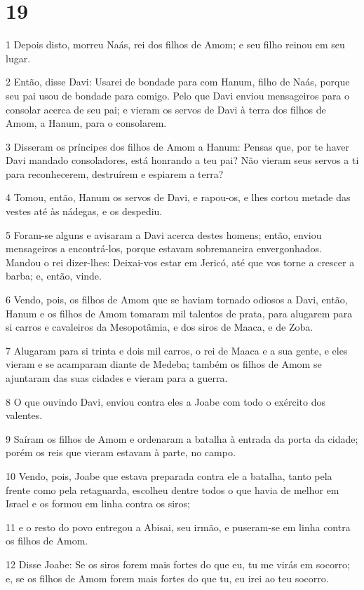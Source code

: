 \chapter{19}

\par 1 Depois disto, morreu Naás, rei dos filhos de Amom; e seu filho reinou em seu lugar.
\par 2 Então, disse Davi: Usarei de bondade para com Hanum, filho de Naás, porque seu pai usou de bondade para comigo. Pelo que Davi enviou mensageiros para o consolar acerca de seu pai; e vieram os servos de Davi à terra dos filhos de Amom, a Hanum, para o consolarem.
\par 3 Disseram os príncipes dos filhos de Amom a Hanum: Pensas que, por te haver Davi mandado consoladores, está honrando a teu pai? Não vieram seus servos a ti para reconhecerem, destruírem e espiarem a terra?
\par 4 Tomou, então, Hanum os servos de Davi, e rapou-os, e lhes cortou metade das vestes até às nádegas, e os despediu.
\par 5 Foram-se alguns e avisaram a Davi acerca destes homens; então, enviou mensageiros a encontrá-los, porque estavam sobremaneira envergonhados. Mandou o rei dizer-lhes: Deixai-vos estar em Jericó, até que vos torne a crescer a barba; e, então, vinde.
\par 6 Vendo, pois, os filhos de Amom que se haviam tornado odiosos a Davi, então, Hanum e os filhos de Amom tomaram mil talentos de prata, para alugarem para si carros e cavaleiros da Mesopotâmia, e dos siros de Maaca, e de Zoba.
\par 7 Alugaram para si trinta e dois mil carros, o rei de Maaca e a sua gente, e eles vieram e se acamparam diante de Medeba; também os filhos de Amom se ajuntaram das suas cidades e vieram para a guerra.
\par 8 O que ouvindo Davi, enviou contra eles a Joabe com todo o exército dos valentes.
\par 9 Saíram os filhos de Amom e ordenaram a batalha à entrada da porta da cidade; porém os reis que vieram estavam à parte, no campo.
\par 10 Vendo, pois, Joabe que estava preparada contra ele a batalha, tanto pela frente como pela retaguarda, escolheu dentre todos o que havia de melhor em Israel e os formou em linha contra os siros;
\par 11 e o resto do povo entregou a Abisai, seu irmão, e puseram-se em linha contra os filhos de Amom.
\par 12 Disse Joabe: Se os siros forem mais fortes do que eu, tu me virás em socorro; e, se os filhos de Amom forem mais fortes do que tu, eu irei ao teu socorro.

